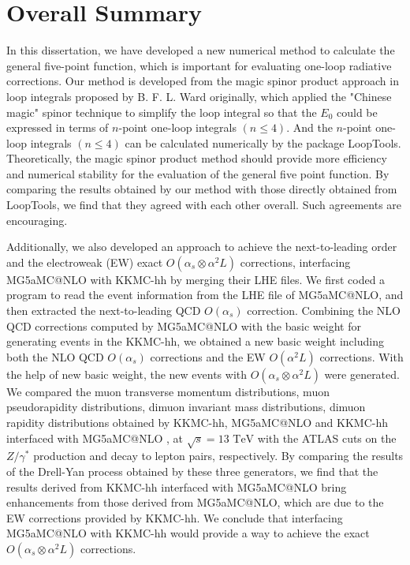 \chapter{Overall Summary}
In this dissertation, we have developed a new numerical method to calculate the general five-point function, which is important for evaluating one-loop radiative corrections. Our method is developed from the magic spinor product approach in loop integrals proposed by B. F. L. Ward originally, which applied the "Chinese magic" spinor technique to simplify the loop integral so that the $E_0$ could be expressed in terms of $n$-point one-loop integrals $(n\leq4)$. And the $n$-point one-loop integrals $(n\leq4)$ can be calculated numerically by the package LoopTools. Theoretically, the magic spinor product method should provide more efficiency and numerical stability for the evaluation of the general five point function. By comparing the results obtained by our method with those directly obtained from LoopTools, we find that they agreed with each other overall. Such agreements are encouraging.

Additionally, we also developed an approach to achieve the next-to-leading order and the electroweak (EW) exact $O(\alpha_s\otimes\alpha^2L)$ corrections, interfacing MG5\textunderscore aMC@NLO with KKMC-hh by merging their LHE files. We first coded a program to read the event information from the LHE file of MG5\textunderscore aMC@NLO, and then extracted the next-to-leading QCD $O(\alpha_s)$ correction. Combining the NLO QCD corrections computed by MG5\textunderscore aMC@NLO with the basic weight for generating events in the KKMC-hh, we obtained a new basic weight including both the NLO QCD $O(\alpha_s)$ corrections and the EW $O(\alpha^2L)$ corrections. With the help of new basic weight, the new events with $O(\alpha_s\otimes\alpha^2L)$ were generated. We compared the muon transverse momentum distributions, muon pseudorapidity distributions, dimuon invariant mass distributions, dimuon rapidity distributions obtained by KKMC-hh, MG5\textunderscore aMC@NLO and KKMC-hh interfaced with MG5\textunderscore aMC@NLO , at $\sqrt{s}=13\text{ TeV}$ with the ATLAS cuts on the $Z/\gamma^\ast$ production and decay to lepton pairs, respectively. By comparing the results of the Drell-Yan process obtained by these three generators, we find that the results derived from KKMC-hh interfaced with MG5\textunderscore aMC@NLO bring enhancements from those derived from MG5\textunderscore aMC@NLO, which are due to the EW corrections provided by KKMC-hh. We conclude that interfacing MG5\textunderscore aMC@NLO with KKMC-hh would provide a way to achieve the exact $O(\alpha_s\otimes\alpha^2L)$ corrections. 
 
